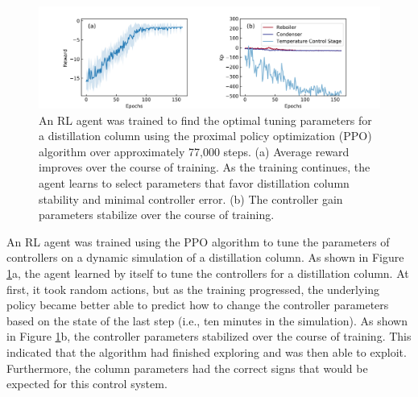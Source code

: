 \begin{figure}[tb]
  \includegraphics[width=\textwidth]{gfx/Chapter05/dis3_74_reward_parameters.png}
  \caption{An RL agent was trained to find the optimal tuning parameters for a distillation column using the proximal policy optimization (PPO) algorithm over approximately 77,000 steps. (a) Average reward improves over the course of training. As the training continues, the agent learns to select parameters that favor distillation column stability and minimal controller error. (b) The controller gain parameters stabilize over the course of training.}
  \label{ppo_training_curve}
\end{figure}

An RL agent was trained using the PPO algorithm to tune the parameters of controllers on a dynamic simulation of a distillation column. As shown in Figure \ref{ppo_training_curve}a, the agent learned by itself to tune the controllers for a distillation column. At first, it took random actions, but as the training progressed, the underlying policy became better able to predict how to change the controller parameters based on the state of the last step (i.e., ten minutes in the simulation). As shown in Figure \ref{ppo_training_curve}b, the controller parameters stabilized over the course of training. This indicated that the algorithm had finished exploring and was then able to exploit. Furthermore, the column parameters had the correct signs that would be expected for this control system.

